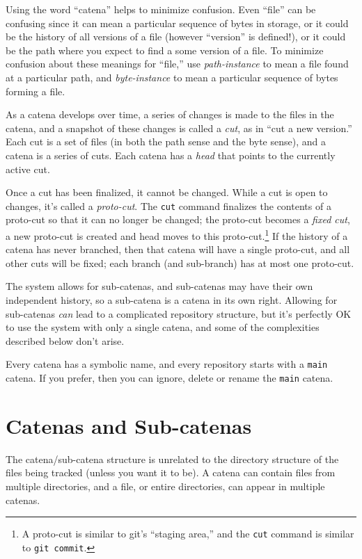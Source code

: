 \documentclass[10pt]{article}
\begin{document}
Using the word ``catena'' helps to minimize confusion. Even
``file'' can be confusing since it can mean a particular sequence of
bytes in storage, or it could be the history of all versions of a file
(however ``version'' is defined!), or it could be the path where you
expect to find a some version of a file. To minimize confusion about
these meanings for ``file,'' use {\it path-instance} to mean a file
found at a particular path, and {\it byte-instance} to mean a 
particular sequence of bytes forming a file.

As a catena develops over time, a series of changes is made to the files in
the catena, and a snapshot of these changes is called a {\it cut}, as
in ``cut a new version.'' Each cut is a set of files (in both the path
sense and the byte sense), and a catena is a series of cuts. Each
catena has a {\it head} that points to the currently active cut.

Once a cut has been finalized, it cannot be changed. While a cut is
open to changes, it's called a {\it proto-cut}. The {\tt cut} command
finalizes the contents of a proto-cut so that it can no longer be changed;
the proto-cut becomes a {\it fixed cut}, a new proto-cut is created
and head moves to this proto-cut.\footnote{A proto-cut is similar
  to git's ``staging area,'' and the {\tt cut} command is
  similar to {\tt git commit}.} If the history of a catena has never branched, then that catena will
have a single proto-cut, and all other cuts will be fixed; each branch
(and sub-branch) has at most one proto-cut. 

The system allows for sub-catenas, and sub-catenas may have their own 
independent history, so a sub-catena is a catena in its own right.
Allowing for sub-catenas {\it can} lead to a complicated repository
structure, but it's perfectly OK to use the system with only a single
catena, and some of the complexities described below don't arise.

Every catena has a symbolic name, and every repository starts with a
{\tt main} catena. If you prefer, then you can ignore, delete or rename the
{\tt main} catena. 

\section{Catenas and Sub-catenas}

The catena/sub-catena structure is unrelated to the directory structure 
of the files being tracked (unless you want it to be). A catena can
contain files from multiple directories, and a file, or entire
directories, can appear in multiple catenas. 
\end{document}

